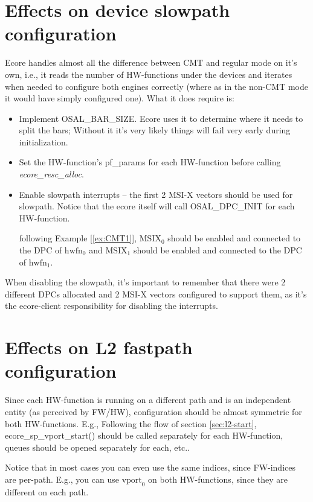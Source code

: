 \documentclass[11pt,fleqn,hidelinks,oneside]{book} %
\begin{document}
\section{Effects on device slowpath configuration}
Ecore handles almost all the difference between CMT and regular mode on it's own, i.e., it reads the number of HW-functions under the devices and iterates when needed to configure both engines correctly (where as in the non-CMT mode it would have simply configured one).
What it does require is:
\begin{itemize}
	\item Implement OSAL\_BAR\_SIZE. Ecore uses it to determine where it needs to split the bars; Without it it's very likely things will fail very early during initialization.
	
	\item Set the HW-function's pf\_params for each HW-function before calling \textit{ecore\_resc\_alloc}.
	
	\item Enable slowpath interrupts -- the first 2 MSI-X vectors should be used for slowpath. Notice that the ecore itself will call OSAL\_DPC\_INIT for each HW-function.
	\begin {exampleT}
		following Example [\ref{ex:CMT1}], $\text{MSIX}_0$ should be enabled and connected to the DPC of $\text{hwfn}_0$ and $\text{MSIX}_1$ should be enabled and connected to the DPC of $\text{hwfn}_1$.
	\end{exampleT}
\end{itemize}

When disabling the slowpath, it's important to remember that there were 2 different DPCs allocated and 2 MSI-X vectors configured to support them, as it's the ecore-client responsibility for disabling the interrupts.

\section{Effects on L2 fastpath configuration}
Since each HW-function is running on a different path and is an independent entity (as perceived by FW/HW), configuration should be almost symmetric for both HW-functions. E.g., Following the flow of section \ref{sec:l2-start}, ecore\_sp\_vport\_start() should be called separately for each HW-function, queues should be opened separately for each, etc..

Notice that in most cases you can even use the same indices, since FW-indices are per-path. E.g., you can use $\text{vport}_0$ on both HW-functions, since they are different on each path.
\end{document}
